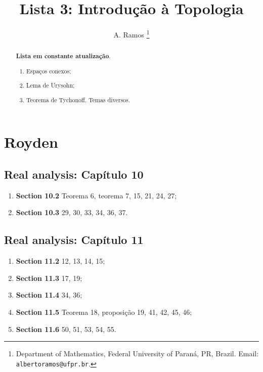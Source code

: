 \documentclass[latin,20pt]{article}
\begin{document}
\title{Lista 3: Introdução à Topologia }
 
\author{
A. Ramos \thanks{Department of Mathematics,
    Federal University of Paraná, PR, Brazil.
    Email: {\tt albertoramos@ufpr.br}.}
}

\date{}
 
\maketitle

\begin{abstract}
{\bf Lista em constante atualização}.
 \begin{enumerate}
 \item Espaços conexos;
 \item Lema de Urysohn; 
 \item Teorema de Tychonoff. Temas diversos. 
 \end{enumerate}
\end{abstract}

  
  \section*{Royden}
  \subsection*{Real analysis: Capítulo 10}
    \begin{enumerate}
    \item {\bf Section 10.2} Teorema 6, teorema 7, 15, 21, 24, 27;
    \item {\bf Section 10.3} 29, 30, 33, 34, 36, 37.
    \end{enumerate}
  \subsection*{Real analysis: Capítulo 11}
    \begin{enumerate}
    \item {\bf Section 11.2} 12, 13, 14, 15;
    \item {\bf Section 11.3} 17, 19;
    \item {\bf Section 11.4} 34, 36;
    \item {\bf Section 11.5} Teorema 18, proposição 19, 41, 42, 45, 46;
    \item {\bf Section 11.6} 50, 51, 53, 54, 55.
    \end{enumerate}
\end{document}
